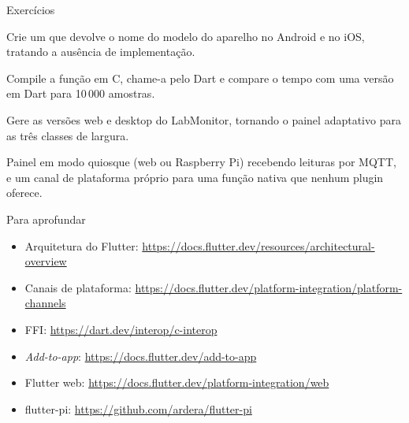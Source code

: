 \documentclass[aspectratio=169,10pt]{beamer}
\begin{document}
\begin{frame}{Exercícios}
  \begin{exercicio}
    Crie um  que devolve o nome do modelo do aparelho no Android e no iOS, tratando a ausência de implementação.
  \end{exercicio}
  \begin{exercicio}
    Compile a função  em C, chame-a pelo Dart e compare o tempo com uma versão em Dart para 10\,000 amostras.
  \end{exercicio}
  \begin{exercicio}
    Gere as versões web e desktop do LabMonitor, tornando o painel adaptativo para as três classes de largura.
  \end{exercicio}
  \begin{projeto}
    Painel em modo quiosque (web ou Raspberry Pi) recebendo leituras por MQTT, e um canal de plataforma próprio para uma função nativa que nenhum plugin oferece.
  \end{projeto}
\end{frame}

\begin{frame}{Para aprofundar}
  \small
  \begin{itemize}
    \item Arquitetura do Flutter: \url{https://docs.flutter.dev/resources/architectural-overview}
    \item Canais de plataforma: \url{https://docs.flutter.dev/platform-integration/platform-channels}
    \item FFI: \url{https://dart.dev/interop/c-interop}
    \item \emph{Add-to-app}: \url{https://docs.flutter.dev/add-to-app}
    \item Flutter web: \url{https://docs.flutter.dev/platform-integration/web}
    \item flutter-pi: \url{https://github.com/ardera/flutter-pi}
  \end{itemize}
\end{frame}
\end{document}
